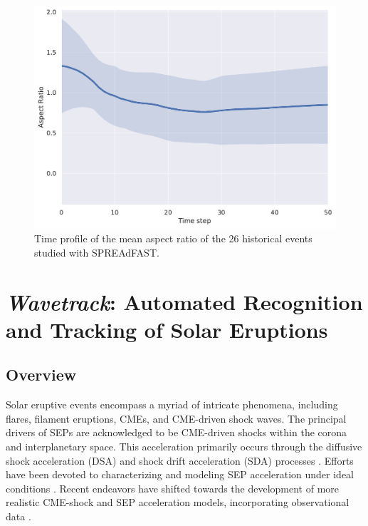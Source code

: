 \begin{figure}[!htp] %
	\centerline{\includegraphics[width=0.8\columnwidth]{chapter2/figs/mean_aspectratio_stat.pdf}}
	\caption{Time profile of the mean aspect ratio of the 26 historical events studied with SPREAdFAST.}
	\label{fig_mean_aspectratio_all}
\end{figure}


\section{\textit{Wavetrack}: Automated Recognition and Tracking of Solar Eruptions}
\subsection{Overview}
Solar eruptive events encompass a myriad of intricate phenomena, including flares, filament eruptions, CMEs, and CME-driven shock waves. The principal drivers of SEPs are acknowledged to be CME-driven shocks within the corona and interplanetary space. This acceleration primarily occurs through the diffusive shock acceleration (DSA) and shock drift acceleration (SDA) processes \citep{reames_2021}. Efforts have been devoted to characterizing and modeling SEP acceleration under ideal conditions \citep{vainio_2008, sokolov_2009, kozarev_2013}. Recent endeavors have shifted towards the development of more realistic CME-shock and SEP acceleration models, incorporating observational data \citep{vourlidas_2012, kwon_2014, kozarev_2015, kozarev_2019}.

